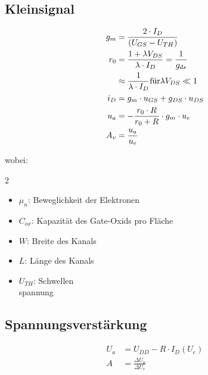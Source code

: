 \documentclass{article}
\begin{document}
    \begin{minipage}[t]{0.23\textwidth}
        \subsection*{Kleinsignal}
            \begin{align*}
                g_m &= \frac{2\cdot I_D}{(U_{GS}-U_{TH})}\\
                r_0 &= \frac{1+\lambda V_{DS}}{\lambda \cdot I_D}=\frac{1}{g_{ds}}\\
                &\approx \frac{1}{\lambda\cdot I_D}\space\text{für}\lambda V_{DS}\ll 1\\
                i_D &= g_m\cdot u_{GS}+g_{DS}\cdot u_{DS}\\
                u_a &= - \frac{r_0\cdot R}{r_0+R}\cdot g_m\cdot u_e\\
                A_v &= \frac{u_a}{u_e}
            \end{align*}
    \end{minipage}

    \begin{minipage}[t]{0.49\textwidth}
wobei:
\begin{multicols}{2}
    \begin{itemize}
        \item $\mu_n$: Beweglichkeit der Elektronen
        \item $C_{ox}$: Kapazität des Gate-Oxids pro Fläche
        \item $W$: Breite des Kanals
        \item $L$: Länge des Kanals
        \item $U_{TH}$: Schwellen\\spannung
\end{itemize}
\end{multicols}
\end{minipage}
\begin{minipage}[t]{0.49\textwidth}
\subsection*{Spannungsverstärkung}
\begin{align*}
    U_a &= U_{DD}-R\cdot I_D (U_e)\\
    A &= \frac{\Delta U_a}{\Delta U_e}
\end{align*}
\end{minipage}
\end{document}
